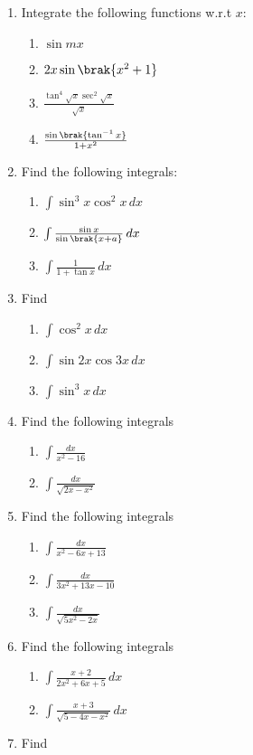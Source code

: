 \begin{enumerate}[label=\arabic*.,ref=\thesubsection.\theenumi]
%
\item Integrate the following functions w.r.t $x$:
\begin{enumerate}
%
\item  $\sin mx$
\item  $2x\sin \brak{x^2+1}$
\item  $\frac{\tan^4 \sqrt{x} \sec^2\sqrt{x}}{\sqrt{x}}$
\item  $\frac{\sin \brak{\tan ^{-1}x}}{1+x^2}$
%
\end{enumerate}
%
\item Find the following integrals:
\begin{enumerate}
%
\item  $\int \sin^3 x \cos ^2 x \, dx$
\item  $\int \frac{\sin x}{\sin \brak{x+a}} \, dx$
\item  $\int \frac{1}{1+\tan x}  \, dx$
%
\end{enumerate}
%
\item Find 
\begin{enumerate}
%
\item  $\int \cos ^2 x \, dx$
\item  $\int \sin 2x \cos 3x\, dx$
\item  $\int \sin^3 x \, dx$
%
\end{enumerate}
%
\item Find the following integrals
\begin{enumerate}
%
\item  $\int \frac{dx}{x^2-16}$
\item  $\int \frac{dx}{\sqrt{2x-x^2}}$
%
\end{enumerate}
%
\item Find the following integrals
\begin{enumerate}
%
\item  $\int \frac{dx}{x^2-6x + 13}$
\item  $\int \frac{dx}{3x^2 + 13x -10}$
\item  $\int \frac{dx}{\sqrt{5x^2-2x}}$
%
\end{enumerate}
%
\item Find the following integrals
\begin{enumerate}
%
\item  $\int \frac{x+2}{2x^2+6x + 5}\,dx$
\item  $\int \frac{x+3}{\sqrt{5-4x-x^2}}\,dx$
%
\end{enumerate}
\item Find 
\begin{align}

\end{align}
\end{enumerate}
